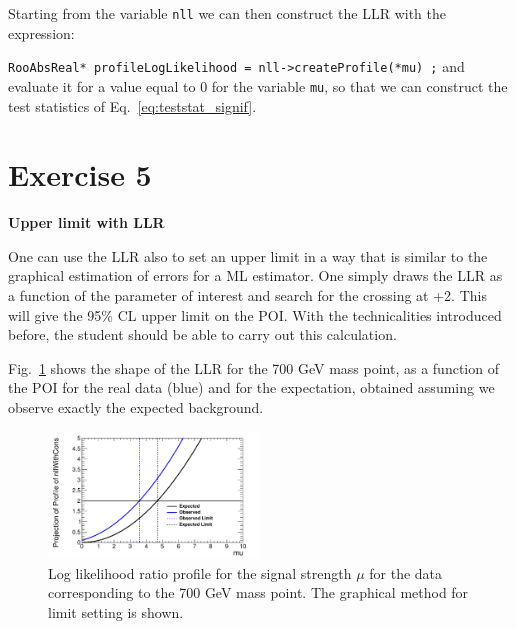 \documentclass[a4paper,12pt]{article}
\begin{document}
Starting from the variable \verb+nll+ we can then construct the LLR with the
expression:

\verb+RooAbsReal* profileLogLikelihood = nll->createProfile(*mu) ;+
and evaluate it for a value equal to 0 for the variable \verb+mu+, so that we
can construct the test statistics of Eq.~\ref{eq:teststat_signif}.


\section*{Exercise 5}
{\bf Upper limit with LLR}

One can use the LLR also to set an upper limit in a way that is similar to the
graphical estimation of errors for a ML estimator. One simply draws the LLR as
a function of the parameter of interest and search for the crossing at +2.
This will give the 95\% CL upper limit on the POI.
With the technicalities introduced before, the student should be able to carry
out this calculation.

Fig.~\ref{fig:profile} shows the shape of the LLR for the 700 GeV mass point, 
as a function of the POI for the real data (blue) and for the expectation, obtained assuming we observe
exactly the expected background. 

\begin{figure}[!b]
\centering
\includegraphics[width=0.5\textwidth]{images/limitLLR.pdf}
\caption{Log likelihood ratio profile for the signal strength $\mu$ for the
data corresponding to the 700 GeV mass point. The graphical method for limit
setting is shown.\label{fig:profile}}
\end{figure}
\end{document}
